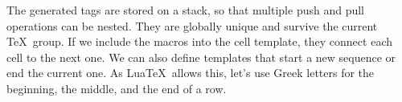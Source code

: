 \documentclass{longmath-doc}
\begin{document}
The generated tags are stored on a stack, so that multiple push and pull operations can be nested. They are globally unique and survive the current \TeX\ group. If we include the macros into the cell template, they connect each cell to the next one. We can also define templates that start a new sequence or end the current one. As Lua\TeX\ allows this, let's use Greek letters for the beginning, the middle, and the end of a row.  
\begin{code*}
\end{code*}
\end{document}
